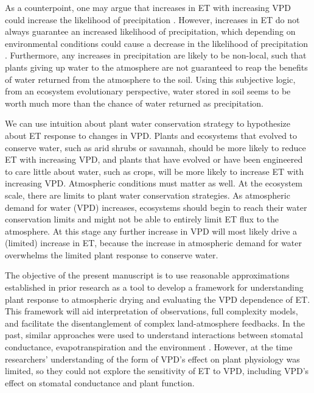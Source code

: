 As a counterpoint, one may argue that increases in ET with increasing
VPD could increase the likelihood of precipitation
\citep[e.g.,][]{Findell_2011}. However, increases in ET do not always
guarantee an increased likelihood of precipitation, which depending on
environmental conditions could cause a decrease in the likelihood of
precipitation \citep[][]{Gentine_2013}. Furthermore, any increases in
precipitation are likely to be non-local, such that plants giving up
water to the atmosphere are not guaranteed to reap the benefits of
water returned from the atmosphere to the soil. Using this subjective
logic, from an ecosystem evolutionary perspective, water stored in
soil seems to be worth much more than the chance of water returned as
precipitation.

We can use intuition about plant water conservation strategy to
hypothesize about ET response to changes in VPD. Plants and ecosystems
that evolved to conserve water, such as arid shrubs or savannah,
should be more likely to reduce ET with increasing VPD, and plants
that have evolved or have been engineered to care little about water,
such as crops, will be more likely to increase ET with increasing
VPD. Atmospheric conditions must matter as well. At the ecosystem
scale, there are limits to plant water conservation strategies. As
atmospheric demand for water (VPD) increases, ecosystems should begin
to reach their water conservation limits and might not be able to
entirely limit ET flux to the atmosphere. At this stage any further
increase in VPD will most likely drive a (limited) increase in ET,
because the increase in atmospheric demand for water overwhelms the
limited plant response to conserve water.

The objective of the present manuscript is to use reasonable
approximations established in prior research as a tool to develop a
framework for understanding plant response to atmospheric drying and
evaluating the VPD dependence of ET. This framework will aid
interpretation of observations, full complexity models, and facilitate
the disentanglement of complex land-atmosphere feedbacks. In the past,
similar approaches were used to understand interactions between
stomatal conductance, evapotranspiration and the environment
\citep[e.g.,][]{Jarvis_1986, Mcnaughton_1991}. However, at the time
researchers' understanding of the form of VPD's effect on plant
physiology was limited, so they could not explore the sensitivity of
ET to VPD, including VPD's effect on stomatal conductance and plant
function.

